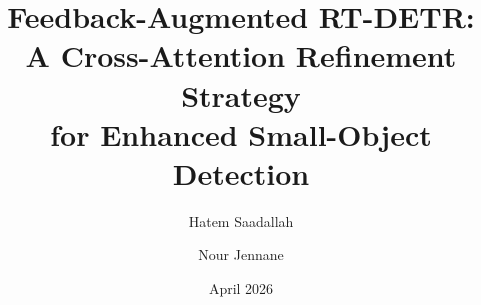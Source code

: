 \documentclass[11pt,a4paper]{article}
\title{\textbf{Feedback-Augmented RT-DETR:} \\[0.2em] A Cross-Attention Refinement Strategy \\ for Enhanced Small-Object Detection}
\author[1]{Hatem Saadallah}
\author[1]{Nour Jennane}
\affil[1]{Computer Vision and Image Processing, Bocconi University}
\date{April 2026}
\begin{document}
\maketitle

\begin{abstract}

\end{abstract}

























\end{document}

